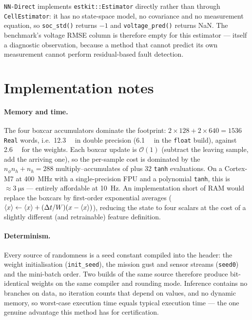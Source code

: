 \texttt{NN-Direct} implements \texttt{estkit::Estimator} directly rather than through
\texttt{CellEstimator}: it has no state-space model, no covariance and no measurement equation, so
\texttt{soc\_std()} returns $-1$ and \texttt{voltage\_pred()} returns NaN.  The benchmark's voltage
RMSE column is therefore empty for this estimator --- itself a diagnostic observation, because a
method that cannot predict its own measurement cannot perform residual-based fault detection.

\section{Implementation notes}
\paragraph{Memory and time.}  The four boxcar accumulators dominate the footprint:
$2\times128 + 2\times640 = \num{1536}$ \texttt{Real} words, i.e.\ \SI{12.3}{\kilo\byte} in double
precision (\SI{6.1}{\kilo\byte} in the \texttt{float} build), against \SI{2.6}{\kilo\byte} for the
weights.  Each boxcar update is $\mathcal{O}(1)$ (subtract the leaving sample, add the arriving
one), so the per-sample cost is dominated by the $n_\phi n_h + n_h = \num{288}$ multiply--accumulates
of  plus $32$ \texttt{tanh} evaluations.  On a Cortex-M7 at
\SI{400}{\mega\hertz} with a single-precision FPU and a polynomial \texttt{tanh}, this is
$\approx\SI{3}{\micro\second}$ --- entirely affordable at \SI{10}{\hertz}.  An implementation short
of RAM would replace the boxcars by first-order exponential averages
($\langle x\rangle \leftarrow \langle x\rangle + (\Delta t/W)(x - \langle x\rangle)$), reducing the state
to four scalars at the cost of a slightly different (and retrainable) feature definition.

\paragraph{Determinism.}  Every source of randomness is a seed constant compiled into the header:
the weight initialisation (\texttt{init\_seed}), the mission gust and sensor streams
(\texttt{seed0}) and the mini-batch order.  Two builds of the same source therefore produce
bit-identical weights on the same compiler and rounding mode.  Inference contains no branches on
data, no iteration counts that depend on values, and no dynamic memory, so worst-case execution
time equals typical execution time --- the one genuine advantage this method has for certification.

